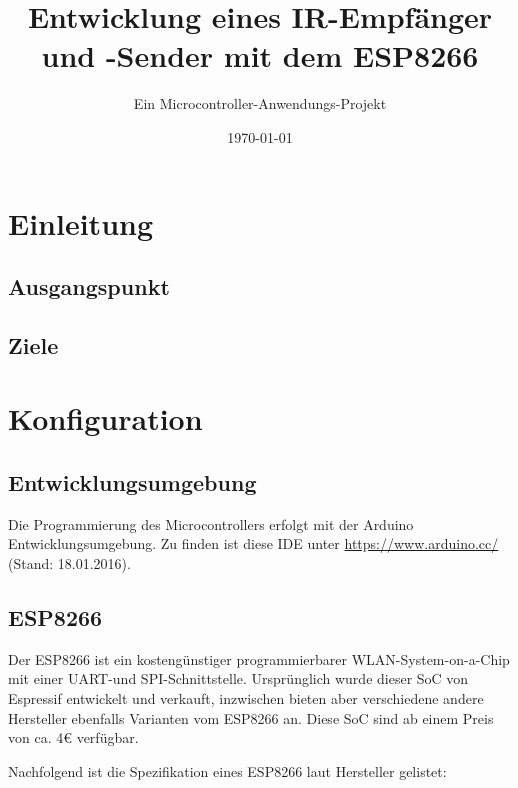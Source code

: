 						




\title{Entwicklung eines IR-Empfänger und -Sender mit dem ESP8266}
\subtitle{Ein Microcontroller-Anwendungs-Projekt}
\author{} %
\date{\today}

\maketitle

\tableofcontents										%
\pagebreak
\listoffigures											%
\pagebreak
\listoftables											%
\pagebreak

\section{Einleitung}

\subsection{Ausgangspunkt}
\subsection{Ziele}

\section{Konfiguration}
\subsection{Entwicklungsumgebung}
Die Programmierung des Microcontrollers erfolgt mit der Arduino Entwicklungsumgebung.
Zu finden ist diese IDE unter \url{https://www.arduino.cc/} (Stand: 18.01.2016).

\subsection{ESP8266}
Der ESP8266 ist ein kostengünstiger programmierbarer WLAN-System-on-a-Chip mit einer UART-und SPI-Schnittstelle.
Ursprünglich wurde dieser SoC von Espressif entwickelt und verkauft, inzwischen bieten aber verschiedene andere Hersteller ebenfalls Varianten vom ESP8266 an.
Diese SoC sind ab einem Preis von ca. 4€ verfügbar.

Nachfolgend ist die Spezifikation eines ESP8266 laut Hersteller gelistet:

